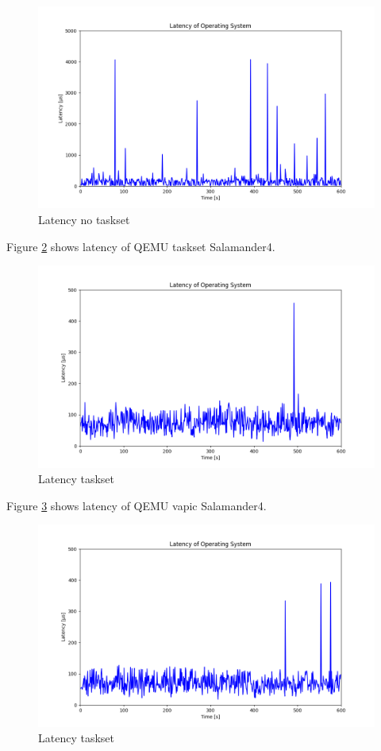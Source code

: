 \documentclass[MMR,Master,english]{twbook}
\begin{document}
\begin{figure}[H]
	\centering
	\includegraphics[width=0.75\columnwidth]{img/max_latency_default.png}
	\caption[Latency no taskset]{Latency no taskset}
	\label{fig:max_latency_default}
\end{figure}


Figure \ref{fig:max_latency_taskset} shows latency of QEMU taskset Salamander4.
\begin{figure}[H]
	\centering
	\includegraphics[width=0.75\columnwidth]{img/max_latency_taskset.png}
	\caption[Latency taskset]{Latency taskset}
	\label{fig:max_latency_taskset}
\end{figure}

Figure \ref{fig:max_latency_vapic} shows latency of QEMU vapic Salamander4.
\begin{figure}[H]
	\centering
	\includegraphics[width=0.75\columnwidth]{img/max_latency_vapic.png}
	\caption[Latency taskset]{Latency taskset}
	\label{fig:max_latency_vapic}
\end{figure}
\end{document}
